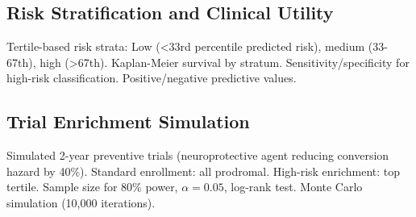 \subsection{Risk Stratification and Clinical Utility}
Tertile-based risk strata: Low (<33rd percentile predicted risk), medium (33-67th), high (>67th). Kaplan-Meier survival by stratum. Sensitivity/specificity for high-risk classification. Positive/negative predictive values.

\subsection{Trial Enrichment Simulation}
Simulated 2-year preventive trials (neuroprotective agent reducing conversion hazard by 40\%). Standard enrollment: all prodromal. High-risk enrichment: top tertile. Sample size for 80\% power, $\alpha=0.05$, log-rank test. Monte Carlo simulation (10,000 iterations).
